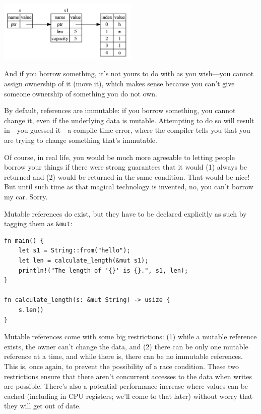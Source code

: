 \begin{center}
\includegraphics[width=0.5\textwidth]{images/string-with-ref.png}
\end{center}

And if you borrow something, it's not yours to do with as you wish---you cannot assign ownership of it (move it), which makes sense because you can't give someone ownership of something you do not own.

By default, references are immutable: if you borrow something, you cannot change it, even if the underlying data is mutable. Attempting to do so will result in---you guessed it---a compile time error, where the compiler tells you that you are trying to change something that's immutable. 

Of course, in real life, you would be much more agreeable to letting people borrow your things if there were strong guarantees that it would (1) always be returned and (2) would be returned in the same condition. That would be nice! But until such time as that magical technology is invented, no, you can't borrow my car. Sorry.

Mutable references do exist, but they have to be declared explicitly as such by tagging them as \texttt{\&mut}:

\begin{lstlisting}
fn main() {
    let s1 = String::from("hello");
    let len = calculate_length(&mut s1);
    println!("The length of '{}' is {}.", s1, len);
}

fn calculate_length(s: &mut String) -> usize {
    s.len()
}
\end{lstlisting}

Mutable references come with  some big restrictions: (1) while a mutable reference exists, the owner can't change the data, and (2) there can be only one mutable reference at a time, and while there is, there can be no immutable references. This is, once again, to prevent the possibility of a race condition. These two restrictions ensure that there aren't concurrent accesses to the data when writes are possible. There's also a potential performance increase where values can be cached (including in CPU registers; we'll come to that later) without worry that they will get out of date.

